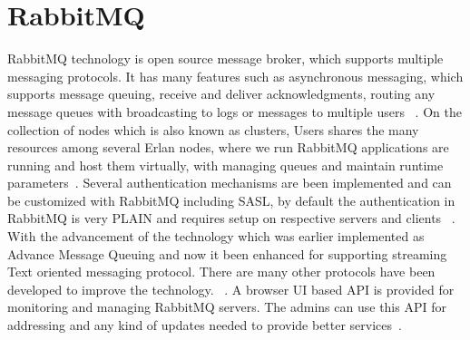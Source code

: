 \section{RabbitMQ}

RabbitMQ technology is open source message broker, which supports multiple 
messaging protocols. It has many features such as asynchronous messaging, 
which supports message queuing, receive and deliver acknowledgments, routing 
any message queues with broadcasting to logs or messages to multiple users
~\cite{hid-sp18-520-RabbitMQ}.
On the collection of nodes which is also known as clusters, Users shares the 
many resources among several Erlan nodes, where we run RabbitMQ applications 
are running and host them virtually, with managing queues and maintain 
runtime parameters~\cite{hid-sp18-520-RabbitMQCluster}.
Several authentication mechanisms are been implemented and can be customized 
with RabbitMQ including SASL, by default the authentication in RabbitMQ is 
very PLAIN and requires setup on respective servers and clients
~\cite{hid-sp18-520-RabbitMQauth}.
With the advancement of the technology which was earlier implemented as 
Advance Message Queuing and now it been enhanced for supporting 
streaming Text oriented messaging protocol. There are many other protocols 
have been developed to improve the technology.
~\cite{hid-sp18-520-RabbitMQwiki}.
A browser UI based API is provided for monitoring and managing RabbitMQ 
servers. The admins can use this API for addressing and any kind of updates 
needed to provide better services~\cite{hid-sp18-520-RabbitMQmana}.
